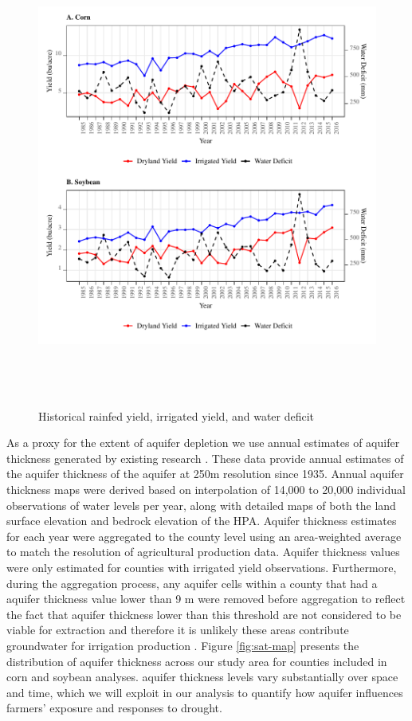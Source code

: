 \documentclass[
]{article}
\begin{document}
\begin{figure}[H]

{\centering \includegraphics[height=6in,]{Figures/g_y_wd_all} 

}

\caption{Historical rainfed yield, irrigated yield, and water deficit}\label{fig:deficit-yield-hist}
\end{figure}

As a proxy for the extent of aquifer depletion we use annual estimates of aquifer thickness generated by existing research \citep{haacker2016water, haacker2023}. These data provide annual estimates of the aquifer thickness of the aquifer at 250m resolution since 1935. Annual aquifer thickness maps were derived based on interpolation of 14,000 to 20,000 individual observations of water levels per year, along with detailed maps of both the land surface elevation and bedrock elevation of the HPA. Aquifer thickness estimates for each year were aggregated to the county level using an area-weighted average to match the resolution of agricultural production data. Aquifer thickness values were only estimated for counties with irrigated yield observations. Furthermore, during the aggregation process, any aquifer cells within a county that had a aquifer thickness value lower than 9 m were removed before aggregation to reflect the fact that aquifer thickness lower than this threshold are not considered to be viable for extraction and therefore it is unlikely these areas contribute groundwater for irrigation production \citep{fenichel2016measuring, haacker2016water, deines2020transitions}. Figure \ref{fig:sat-map} presents the distribution of aquifer thickness across our study area for counties included in corn and soybean analyses. aquifer thickness levels vary substantially over space and time, which we will exploit in our analysis to quantify how aquifer influences farmers' exposure and responses to drought.
\end{document}
